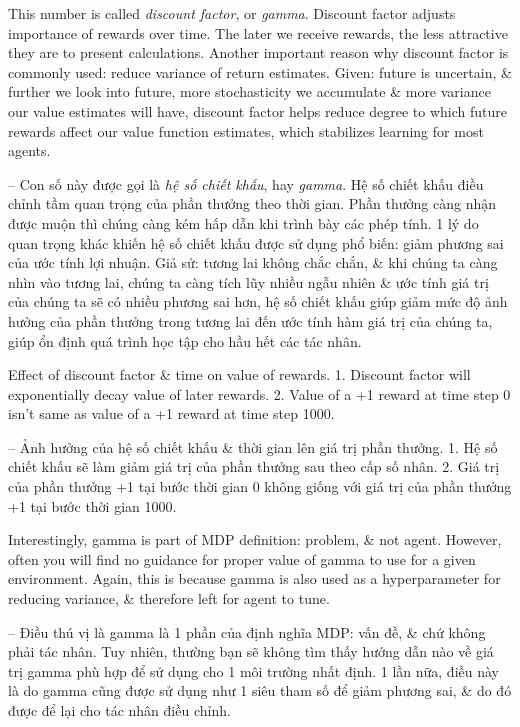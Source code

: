 \documentclass{article}
\begin{document}
\begin{itemize}
\begin{itemize}
        This number is called {\it discount factor}, or {\it gamma}. Discount factor adjusts importance of rewards over time. The later we receive rewards, the less attractive they are to present calculations. Another important reason why discount factor is commonly used: reduce variance of return estimates. Given: future is uncertain, \& further we look into future, more stochasticity we accumulate \& more variance our value estimates will have, discount factor helps reduce degree to which future rewards affect our value function estimates, which stabilizes learning for most agents.

        -- Con số này được gọi là {\it hệ số chiết khấu}, hay {\it gamma}. Hệ số chiết khấu điều chỉnh tầm quan trọng của phần thưởng theo thời gian. Phần thưởng càng nhận được muộn thì chúng càng kém hấp dẫn khi trình bày các phép tính. 1 lý do quan trọng khác khiến hệ số chiết khấu được sử dụng phổ biến: giảm phương sai của ước tính lợi nhuận. Giả sử: tương lai không chắc chắn, \& khi chúng ta càng nhìn vào tương lai, chúng ta càng tích lũy nhiều ngẫu nhiên \& ước tính giá trị của chúng ta sẽ có nhiều phương sai hơn, hệ số chiết khấu giúp giảm mức độ ảnh hưởng của phần thưởng trong tương lai đến ước tính hàm giá trị của chúng ta, giúp ổn định quá trình học tập cho hầu hết các tác nhân.

        {\sf Effect of discount factor \& time on value of rewards.} 1. Discount factor will exponentially decay value of later rewards. 2. Value of a +1 reward at time step 0 isn't same as value of a +1 reward at time step 1000.

        -- {\sf Ảnh hưởng của hệ số chiết khấu \& thời gian lên giá trị phần thưởng.} 1. Hệ số chiết khấu sẽ làm giảm giá trị của phần thưởng sau theo cấp số nhân. 2. Giá trị của phần thưởng +1 tại bước thời gian 0 không giống với giá trị của phần thưởng +1 tại bước thời gian 1000.

        Interestingly, gamma is part of MDP definition: problem, \& not agent. However, often you will find no guidance for proper value of gamma to use for a given environment. Again, this is because gamma is also used as a hyperparameter for reducing variance, \& therefore left for agent to tune.

        -- Điều thú vị là gamma là 1 phần của định nghĩa MDP: vấn đề, \& chứ không phải tác nhân. Tuy nhiên, thường bạn sẽ không tìm thấy hướng dẫn nào về giá trị gamma phù hợp để sử dụng cho 1 môi trường nhất định. 1 lần nữa, điều này là do gamma cũng được sử dụng như 1 siêu tham số để giảm phương sai, \& do đó được để lại cho tác nhân điều chỉnh.


\end{itemize}
\end{itemize}
\end{document}
